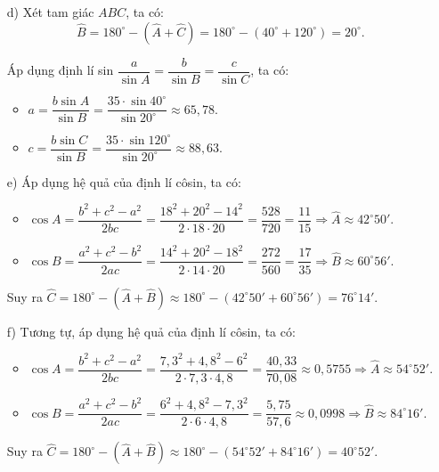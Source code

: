 \begin{baitap}
{\begin{enumerate}
			Áp dụng định lí sin $\dfrac{a}{\sin A} = \dfrac{b}{\sin B} = \dfrac{c}{\sin C}$, ta có:
			\begin{itemize}
				\item $a = \dfrac{c \sin A}{\sin C} = \dfrac{14 \cdot \sin 60^\circ}{\sin 80^\circ} \approx 12{,}31$.
				\item $b = \dfrac{c \sin B}{\sin C} = \dfrac{14 \cdot \sin 40^\circ}{\sin 80^\circ} \approx 9{,}14$.
			\end{itemize}
			
			\item[d)] Xét tam giác $ABC$, ta có:
			$$ \widehat{B} = 180^\circ - (\widehat{A} + \widehat{C}) = 180^\circ - (40^\circ + 120^\circ) = 20^\circ. $$
			
			Áp dụng định lí sin $\dfrac{a}{\sin A} = \dfrac{b}{\sin B} = \dfrac{c}{\sin C}$, ta có:
			\begin{itemize}
				\item $a = \dfrac{b \sin A}{\sin B} = \dfrac{35 \cdot \sin 40^\circ}{\sin 20^\circ} \approx 65{,}78$.
				\item $c = \dfrac{b \sin C}{\sin B} = \dfrac{35 \cdot \sin 120^\circ}{\sin 20^\circ} \approx 88{,}63$.
			\end{itemize}
			
			\item[e)] Áp dụng hệ quả của định lí côsin, ta có:
			\begin{itemize}
				\item $\cos A = \dfrac{b^2 + c^2 - a^2}{2bc} = \dfrac{18^2 + 20^2 - 14^2}{2 \cdot 18 \cdot 20} = \dfrac{528}{720} = \dfrac{11}{15} \Rightarrow \widehat{A} \approx 42^\circ 50'$.
				\item $\cos B = \dfrac{a^2 + c^2 - b^2}{2ac} = \dfrac{14^2 + 20^2 - 18^2}{2 \cdot 14 \cdot 20} = \dfrac{272}{560} = \dfrac{17}{35} \Rightarrow \widehat{B} \approx 60^\circ 56'$.
			\end{itemize}
			Suy ra $\widehat{C} = 180^\circ - (\widehat{A} + \widehat{B}) \approx 180^\circ - (42^\circ 50' + 60^\circ 56') = 76^\circ 14'$.
			
			\item[f)] Tương tự, áp dụng hệ quả của định lí côsin, ta có:
			\begin{itemize}
				\item $\cos A = \dfrac{b^2 + c^2 - a^2}{2bc} = \dfrac{7{,}3^2 + 4{,}8^2 - 6^2}{2 \cdot 7{,}3 \cdot 4{,}8} = \dfrac{40{,}33}{70{,}08} \approx 0{,}5755 \Rightarrow \widehat{A} \approx 54^\circ 52'$.
				\item $\cos B = \dfrac{a^2 + c^2 - b^2}{2ac} = \dfrac{6^2 + 4{,}8^2 - 7{,}3^2}{2 \cdot 6 \cdot 4{,}8} = \dfrac{5{,}75}{57{,}6} \approx 0{,}0998 \Rightarrow \widehat{B} \approx 84^\circ 16'$.
			\end{itemize}
			Suy ra $\widehat{C} = 180^\circ - (\widehat{A} + \widehat{B}) \approx 180^\circ - (54^\circ 52' + 84^\circ 16') = 40^\circ 52'$.
		\end{enumerate}
	}
\end{baitap}

